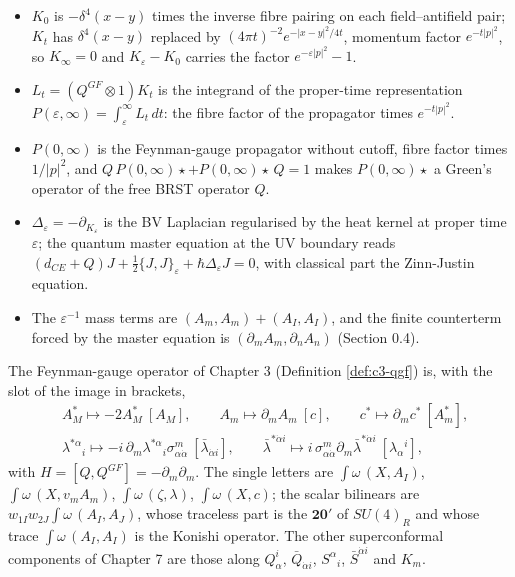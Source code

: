 \begin{remark}
\begin{itemize}
\item $K_0$ is $-\delta^4(x-y)$ times the inverse fibre pairing on each field--antifield pair; $K_t$ has $\delta^4(x-y)$ replaced by $(4\pi t)^{-2}e^{-|x-y|^2/4t}$, momentum factor $e^{-t|p|^2}$, so $K_\infty=0$ and $K_\varepsilon-K_0$ carries the factor $e^{-\varepsilon|p|^2}-1$.
\item $L_t=(Q^{GF}\otimes1)K_t$ is the integrand of the proper-time representation $P(\varepsilon,\infty)=\int_\varepsilon^\infty L_t\,dt$: the fibre factor of the propagator times $e^{-t|p|^2}$.
\item $P(0,\infty)$ is the Feynman-gauge propagator without cutoff, fibre factor times $1/|p|^2$, and $Q\,P(0,\infty)\star+P(0,\infty)\star\,Q=1$ makes $P(0,\infty)\star$ a Green's operator of the free BRST operator $Q$.
\item $\Delta_\varepsilon=-\partial_{K_\varepsilon}$ is the BV Laplacian regularised by the heat kernel at proper time $\varepsilon$; the quantum master equation at the UV boundary reads $(d_{CE}+Q)J+\tfrac12\{J,J\}_\varepsilon+\hbar\Delta_\varepsilon J=0$, with classical part the Zinn-Justin equation.
\item The $\varepsilon^{-1}$ mass terms are $(A_m,A_m)+(A_I,A_I)$, and the finite counterterm forced by the master equation is $(\partial_mA_m,\partial_nA_n)$ (Section 0.4).
\end{itemize}
\end{remark}

\begin{remark}
The Feynman-gauge operator of Chapter 3 (Definition \ref{def:c3-qgf}) is, with the slot of the image in brackets,
\[
\begin{aligned}
&A^*_M\mapsto-2A^*_M\ [A_M],\qquad A_m\mapsto\partial_mA_m\ [c],\qquad c^*\mapsto\partial_mc^*\ [A^*_m],\\
&\lambda^{*\alpha}{}_i\mapsto-i\,\partial_m\lambda^{*\alpha}{}_i\sigma^m_{\alpha\dot\alpha}\ [\bar\lambda_{\dot\alpha i}],\qquad \bar\lambda^{*\dot\alpha i}\mapsto i\,\sigma^m_{\alpha\dot\alpha}\partial_m\bar\lambda^{*\dot\alpha i}\ [\lambda_\alpha{}^i],
\end{aligned}
\]
with $H=[Q,Q^{GF}]=-\partial_m\partial_m$. The single letters are $\int\omega\,(X,A_I)$, $\int\omega\,(X,v_mA_m)$, $\int\omega\,(\zeta,\lambda)$, $\int\omega\,(X,c)$; the scalar bilinears are $w_{1I}w_{2J}\int\omega\,(A_I,A_J)$, whose traceless part is the $\mathbf{20'}$ of $SU(4)_R$ and whose trace $\int\omega\,(A_I,A_I)$ is the Konishi operator. The other superconformal components of Chapter 7 are those along $Q^i_\alpha$, $\bar Q_{\dot\alpha i}$, $S^\alpha{}_i$, $\bar S^{\dot\alpha i}$ and $K_m$.
\end{remark}

